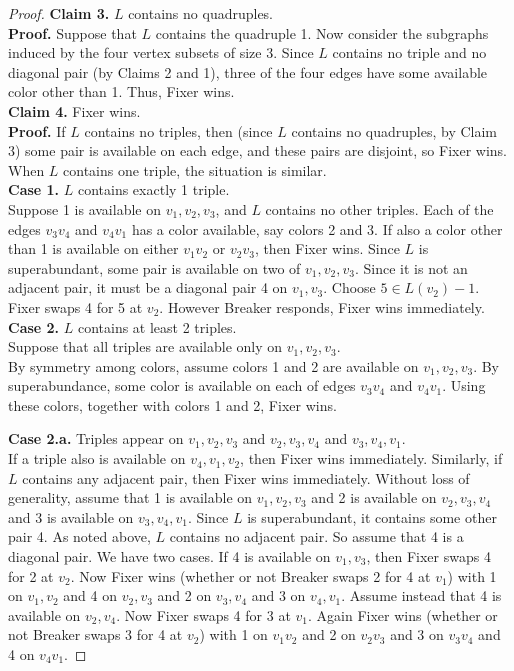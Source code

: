 \documentclass[12pt,reqno]{amsart}
\theoremstyle{plain}
\theoremstyle{definition}
\theoremstyle{remark}
\begin{document}
\begin{proof}
\noindent
\textbf{Claim 3.} $L$ contains no quadruples.\\  
\textbf{Proof.}
Suppose that $L$ contains the quadruple 1.  Now consider the subgraphs
induced by the four vertex subsets of size 3.  Since $L$ contains no triple
and no diagonal pair (by Claims 2 and 1), three of the four edges have some
available color other than 1.  Thus, Fixer wins.\\

\noindent
\textbf{Claim 4.} Fixer wins.\\
\textbf{Proof.}
If $L$ contains no triples, then (since $L$ contains no quadruples, by Claim 3)
some pair is available on each edge, and
these pairs are disjoint, so Fixer wins.
When $L$ contains one triple, the situation is similar.  \\
\textbf{Case 1.} $L$ contains exactly 1 triple.\\
Suppose 1 is available on
$v_1,v_2,v_3$, and $L$ contains no other triples.  Each of the edges $v_3v_4$
and $v_4v_1$ has a color available, say colors 2 and 3.  If also a color other
than 1 is available on either $v_1v_2$ or $v_2v_3$, then Fixer wins. Since $L$
is superabundant, some pair is available on two of $v_1,v_2,v_3$.  Since it is
not an adjacent pair, it must be a diagonal pair 4 on $v_1,v_3$.  Choose $5\in
L(v_2)-1$. Fixer swaps 4 for 5 at $v_2$.  However Breaker responds, Fixer wins
immediately.\\
\textbf{Case 2.} $L$ contains at least 2 triples.\\
Suppose that all triples are available only on $v_1,v_2,v_3$.\\  
By symmetry among colors, assume colors 1 and 2 are available on
$v_1,v_2,v_3$. By superabundance, some color is available on each of edges
$v_3v_4$ and $v_4v_1$.  Using these colors, together with colors 1 and 2, Fixer
wins.

\noindent
\textbf{Case 2.a.} Triples appear on $v_1,v_2,v_3$ and $v_2,v_3,v_4$ and
$v_3,v_4,v_1$.\\
If a triple also is available on $v_4,v_1,v_2$, then Fixer wins immediately.
Similarly, if $L$ contains any adjacent pair, then Fixer wins immediately.
Without loss of generality, assume that 1 is available on $v_1,v_2,v_3$ and 2
is available on $v_2,v_3,v_4$ and 3 is available on $v_3,v_4,v_1$.  Since $L$ is
superabundant, it contains some other pair 4.  As noted above, $L$ contains no
adjacent pair.  So assume that 4 is a diagonal pair.  We have two
cases.  If 4 is available on $v_1,v_3$, then Fixer swaps 4 for 2 at $v_2$.  Now
Fixer wins (whether or not Breaker swaps 2 for 4 at $v_1$) with 1 on $v_1,v_2$
and 4 on $v_2,v_3$ and 2 on $v_3,v_4$ and 3 on $v_4,v_1$.  Assume instead that
4 is available on $v_2,v_4$.  Now Fixer swaps 4 for 3 at $v_1$.  Again Fixer
wins (whether or not Breaker swaps 3 for 4 at $v_2$) with 1 on $v_1v_2$ and 2
on $v_2v_3$ and 3 on $v_3v_4$ and 4 on $v_4v_1$.


\end{proof}
\end{document}

